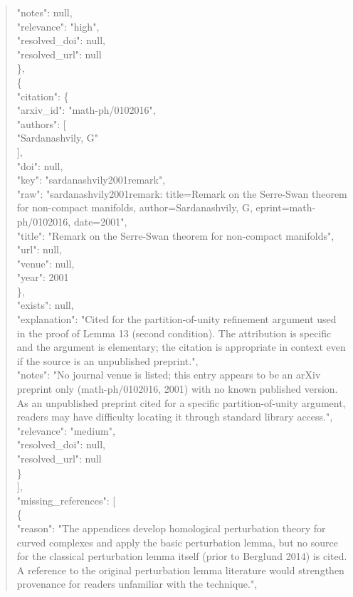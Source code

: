 \documentclass[11pt]{article}
\begin{document}
\begin{quote}
      "notes": null,\\
      "relevance": "high",\\
      "resolved\_doi": null,\\
      "resolved\_url": null\\
    \},\\
    \{\\
      "citation": \{\\
        "arxiv\_id": "math-ph/0102016",\\
        "authors": [\\
          "Sardanashvily, G"\\
        ],\\
        "doi": null,\\
        "key": "sardanashvily2001remark",\\
        "raw": "sardanashvily2001remark: title=Remark on the Serre-Swan theorem for non-compact manifolds, author=Sardanashvily, G, eprint=math-ph/0102016, date=2001",\\
        "title": "Remark on the Serre-Swan theorem for non-compact manifolds",\\
        "url": null,\\
        "venue": null,\\
        "year": 2001\\
      \},\\
      "exists": null,\\
      "explanation": "Cited for the partition-of-unity refinement argument used in the proof of Lemma 13 (second condition). The attribution is specific and the argument is elementary; the citation is appropriate in context even if the source is an unpublished preprint.",\\
      "notes": "No journal venue is listed; this entry appears to be an arXiv preprint only (math-ph/0102016, 2001) with no known published version. As an unpublished preprint cited for a specific partition-of-unity argument, readers may have difficulty locating it through standard library access.",\\
      "relevance": "medium",\\
      "resolved\_doi": null,\\
      "resolved\_url": null\\
    \}\\
  ],\\
  "missing\_references": [\\
    \{\\
      "reason": "The appendices develop homological perturbation theory for curved complexes and apply the basic perturbation lemma, but no source for the classical perturbation lemma itself (prior to Berglund 2014) is cited. A reference to the original perturbation lemma literature would strengthen provenance for readers unfamiliar with the technique.",\\

\end{quote}
\end{document}
